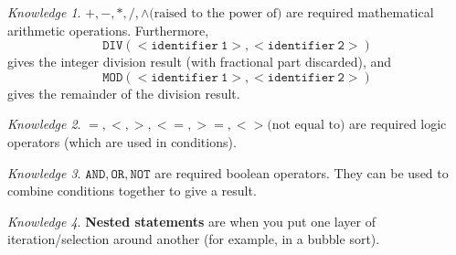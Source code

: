 \documentclass[8pt]{article}
\theoremstyle{remark}
\newtheorem{knowledge}{Knowledge}[subsection]
\begin{document}
            \begin{knowledge}
                \(\mathtt{+}, \mathtt{-}, \mathtt{*}, \mathtt{/}, \mathtt{\wedge} \text{(raised to the power of)}\) are required mathematical arithmetic operations. Furthermore,
                \[
                    \mathtt{DIV(<identifier\ 1>, <identifier\ 2>)}
                \]
                gives the integer division result (with fractional part discarded), and
                \[
                    \mathtt{MOD(<identifier\ 1>, <identifier\ 2>)}
                \]
                gives the remainder of the division result.
            \end{knowledge}

            \begin{knowledge}
                \(\mathtt{=}, \mathtt{<}, \mathtt{>}, \mathtt{<=}, \mathtt{>=}, \mathtt{<>} \text{(not equal to)}\) are required logic operators (which are used in conditions).
            \end{knowledge}

            \begin{knowledge}
                \(\mathtt{AND}, \mathtt{OR}, \mathtt{NOT}\) are required boolean operators. They can be used to combine conditions together to give a result.
            \end{knowledge}

            \begin{knowledge}
                \textbf{Nested statements} are when you put one layer of iteration/selection around another (for example, in a bubble sort).
            \end{knowledge}
\end{document}
